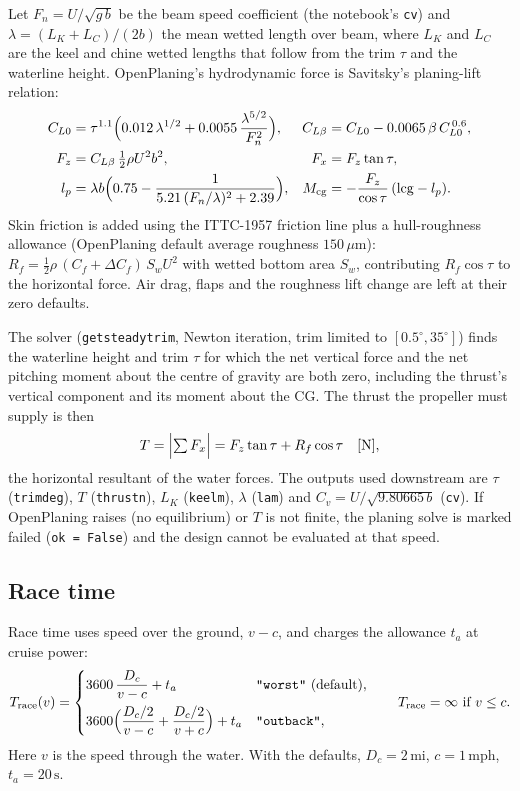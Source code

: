 \documentclass[11pt,a4paper]{article}
\renewcommand{\_}{\textunderscore\allowbreak}
\newcommand{\code}[1]{\texttt{#1}}
\newcommand{\Trace}{T_{\mathrm{race}}}
\begin{document}
Let $F_{n}=U/\sqrt{g\,b}$ be the beam speed coefficient (the notebook's \code{cv}) and $\lambda=(L_K+L_C)/(2b)$ the mean wetted
length over beam, where $L_K$ and $L_C$ are the keel and chine wetted lengths that follow from the trim $\tau$ and the
waterline height. OpenPlaning's hydrodynamic force is Savitsky's planing-lift relation:
\begin{align}
  C_{L0} &= \tau^{1.1}\Bigl(0.012\,\lambda^{1/2} + 0.0055\,\frac{\lambda^{5/2}}{F_n^2}\Bigr), &
  C_{L\beta} &= C_{L0} - 0.0065\,\beta\,C_{L0}^{\,0.6},\nonumber\\
  F_z &= C_{L\beta}\,\tfrac12\rho U^2 b^2, &
  F_x &= F_z\tan\tau, \label{eq:savitsky}\\
  l_p &= \lambda b\Bigl(0.75 - \frac{1}{5.21\,(F_n/\lambda)^2 + 2.39}\Bigr), &
  M_{\mathrm{cg}} &= -\frac{F_z}{\cos\tau}\,(\mathrm{lcg} - l_p). \nonumber
\end{align}
Skin friction is added using the ITTC-1957 friction line plus a hull-roughness allowance (OpenPlaning default average
roughness $150\,\mu\mathrm m$): $R_f = \tfrac12\rho\,(C_f + \Delta C_f)\,S_w U^2$ with wetted bottom area $S_w$, contributing
$R_f\cos\tau$ to the horizontal force. Air drag, flaps and the roughness lift change are left at their zero defaults.

The solver (\code{get\_steady\_trim}, Newton iteration, trim limited to $[0.5^\circ,35^\circ]$) finds the waterline height and trim
$\tau$ for which the net vertical force and the net pitching moment about the centre of gravity are both zero, including the
thrust's vertical component and its moment about the CG. The thrust the propeller must supply is then
\begin{equation}
  T = \Bigl|\textstyle\sum F_x\Bigr| = F_z\tan\tau + R_f\cos\tau \quad[\mathrm N],
  \label{eq:thrust}
\end{equation}
the horizontal resultant of the water forces. The outputs used downstream are
$\tau$ (\code{trim\_deg}), $T$ (\code{thrust\_n}), $L_K$ (\code{keel\_m}), $\lambda$ (\code{lam}) and
$C_v = U/\sqrt{9.80665\,b}$ (\code{cv}). If OpenPlaning raises (no equilibrium) or $T$ is not finite, the planing solve is marked failed
(\code{ok = False}) and the design cannot be evaluated at that speed.

\subsection{Race time}
Race time uses speed over the ground, $v-c$, and charges the allowance $t_a$ at cruise power:
\begin{equation}
  \Trace(v) =
  \begin{cases}
    3600\,\dfrac{D_c}{v-c} + t_a & \code{"worst"} \ (\text{default}),\\[8pt]
    3600\Bigl(\dfrac{D_c/2}{v-c} + \dfrac{D_c/2}{v+c}\Bigr) + t_a & \code{"outback"},
  \end{cases}
  \qquad \Trace=\infty\ \text{if } v\le c.
  \label{eq:racetime}
\end{equation}
Here $v$ is the speed through the water. With the defaults, $D_c=2\,\mathrm{mi}$, $c=1\,\mathrm{mph}$, $t_a=20\,\mathrm s$.
\end{document}
